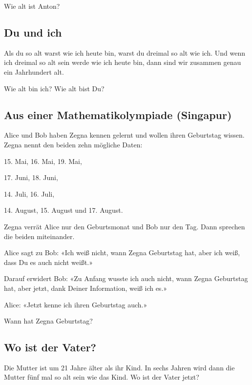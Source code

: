 Wie alt ist Anton?


\subsection{Du und ich}

Als du so alt warst wie ich heute bin, warst du dreimal so alt wie ich. Und wenn
ich dreimal so alt sein werde wie ich heute bin, dann sind wir zusammen genau
ein Jahrhundert alt.

Wie alt bin ich? Wie alt bist Du?


\subsection{Aus einer Mathematikolympiade (Singapur)}
Alice und Bob haben Zegna kennen gelernt und wollen ihren Geburtstag wissen.
Zegna nennt den beiden zehn mögliche Daten:

15. Mai, 16. Mai, 19. Mai,

17. Juni, 18. Juni,

14. Juli, 16. Juli,

14. August, 15. August und 17. August.


Zegna verrät Alice nur den Geburtsmonat und Bob nur den Tag. Dann sprechen
die beiden miteinander.

Alice sagt zu Bob: «Ich weiß nicht, wann Zegna Geburtstag hat, aber ich weiß,
dass Du es auch nicht weißt.»

Darauf erwidert Bob: «Zu Anfang wusste ich auch nicht, wann Zegna Geburtstag
hat, aber jetzt, dank Deiner Information, weiß ich es.»

Alice: «Jetzt kenne ich ihren Geburtstag auch.»

Wann hat Zegna Geburtstag?
\TNTeop{}


\subsection{Wo ist der Vater?}

Die Mutter ist um 21 Jahre älter als ihr Kind. In sechs Jahren wird dann die
Mutter fünf mal so alt sein wie das Kind. Wo ist der Vater jetzt?

\TNTeop{}


